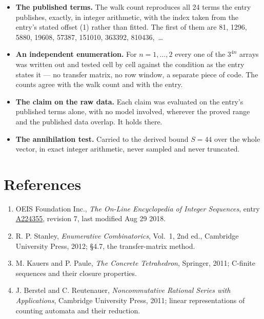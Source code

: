 \documentclass[11pt]{article}
\theoremstyle{definition}
\begin{document}
\begin{itemize}

\item {\bfseries The published terms.} The walk count reproduces all 24 terms the entry publishes, exactly, in integer arithmetic, with the index taken from the entry's stated offset (1) rather than fitted. The first of them are 81, 1296, 5880, 19608, 57387, 151010, 363392, 810436,~\dots

\item {\bfseries An independent enumeration.} For $n = 1,\dots,2$ every one of the $3^{4n}$ arrays was written out and tested cell by cell against the condition as the entry states it --- no transfer matrix, no row window, a separate piece of code. The counts agree with the walk count and with the entry.

\item {\bfseries The claim on the raw data.} Each claim was evaluated on the entry's published terms alone, with no model involved, wherever the proved range and the published data overlap. It holds there.

\item {\bfseries The annihilation test.} Carried to the derived bound $S = 44$ over the whole vector, in exact integer arithmetic, never sampled and never truncated.

\end{itemize}

\section{References}

\begin{enumerate}

\item OEIS Foundation Inc., \emph{The On-Line Encyclopedia of Integer Sequences}, entry \href{https://oeis.org/A224355}{A224355}, revision 7, last modified Aug 29 2018.

\item R. P. Stanley, \emph{Enumerative Combinatorics}, Vol.~1, 2nd ed., Cambridge University Press, 2012; \S4.7, the transfer-matrix method.

\item M. Kauers and P. Paule, \emph{The Concrete Tetrahedron}, Springer, 2011; C-finite sequences and their closure properties.

\item J. Berstel and C. Reutenauer, \emph{Noncommutative Rational Series with Applications}, Cambridge University Press, 2011; linear representations of counting automata and their reduction.

\end{enumerate}
\end{document}
